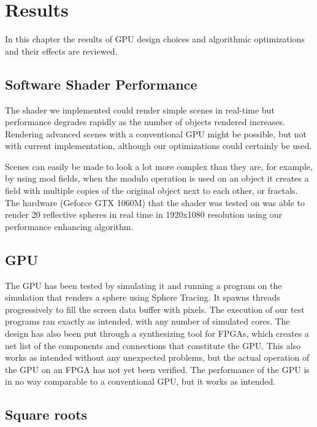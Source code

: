 \chapter{Results}

	In this chapter the results of GPU design choices and algorithmic
	optimizations and their effects are reviewed.

	\section{Software Shader Performance}

		The shader we implemented could render simple scenes in real-time but
		performance degrades rapidly as the number of objects rendered increases.
		Rendering advanced scenes with a conventional GPU might be possible, but 
		not with current implementation, although our optimizations could certainly
		be used.

		Scenes can easily be made to look a lot more complex than they
		are, for example, by using mod fields, when the modulo
		operation is used on an object it creates a field with multiple copies
		of the original object next to each other, or fractals. The hardware
		(Geforce GTX 1060M) that the shader was tested on was able to render 20
		reflective spheres in real time in 1920x1080 resolution using our performance
		enhancing algorithm.
 
	\section{GPU}
	
		The GPU has been tested by simulating it and running a program on the simulation 
		that renders a sphere using Sphere Tracing. It spawns threads
		progressively to fill the screen data buffer with pixels. The execution
		of our test programs ran exactly as intended, with any number of
		simulated cores. The design has also been put through a synthesizing
		tool for FPGAs, which creates a net list of the components and
		connections that constitute the GPU. This also works as intended
		without any unexpected problems, but the actual operation of the GPU on
		an FPGA has not yet been verified. The performance of the GPU is in no way
		comparable to a conventional GPU, but it works as intended.


	
	\section{Square roots}
		
